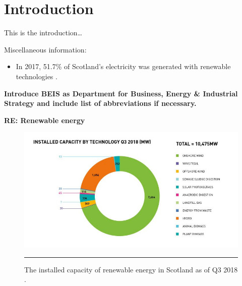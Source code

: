 
\section{Introduction}

This is the introduction…


Miscellaneous information:
\begin{itemize}
	\item	In 2017, 51.7\% of Scotland's electricity was generated with renewable technologies \citep{BEIS2018EnergyTrends}.
\end{itemize}

\textbf{Introduce BEIS as Department for Business, Energy {\&} Industrial Strategy and include list of abbreviations if necessary.}

\textbf{RE: Renewable energy}


\begin{figure}[htbp]
	\centering
	\includegraphics[width=\textwidth]{figures/installed-capacity-by-technology-q3-2018.jpg}
	\rule{\textwidth}{0.5pt} %
	\caption{The installed capacity of renewable energy in Scotland as of Q3 2018 \citep{ScottishRenewables}.}
	\label{fig:installed_capacity}
\end{figure}
